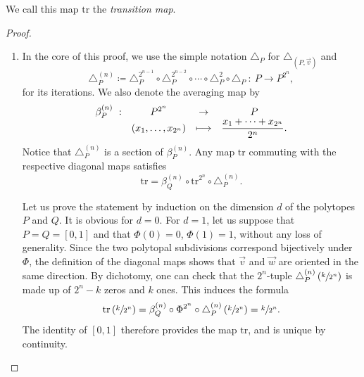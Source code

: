 \documentclass[JEP,XML,SOM,Unicode,NoFloatCountersInSection]{cedram}
\def\mto{\mathchoice{\longmapsto}{\mapsto}{\mapsto}{\mapsto}}
\let\dpl\displaystyle
\theoremstyle{plain}
\theoremstyle{definition}
\newcommand{\tr}{\mathrm{tr}}
\begin{document}
We call this map $\tr$ the \emph{transition map}.

\skpt
\begin{proof}
\begin{enumerate}
\item
In the core of this proof, we use the simple notation $\triangle_P$ for $\triangle_{(P, \vec v)}$ and
\[\triangle^{(n)}_P\coloneqq \triangle^{2^{n-1}}_P\circ \triangle^{2^{n-2}}_P\circ\cdots\circ\triangle^{2}_P\circ\triangle_P\ : \
P\to P^{2^{n}},\]
for its iterations.
We also denote the averaging map by
\begin{align*}
\begin{array}{rccc}
\beta^{(n)}_P\ : & P^{2^n}&\dpl\to &P\\
&(x_1, \ldots, x_{2^n}) & \dpl\mto&
\displaystyle \frac{x_1+\cdots+x_{2^n}}{2^n}.
\end{array}
\end{align*}
Notice that $\triangle^{(n)}_P$ is a section of $\beta^{(n)}_P$.
Any map $\tr$ commuting with the respective diagonal maps satisfies
\[\tr = \beta^{(n)}_Q\circ\tr^{2^n}\circ\triangle^{(n)}_P. \]

Let us prove the statement by induction on the dimension $d$ of the polytopes $P$ and $Q$. It is obvious for $d=0$. For $d=1$, let us suppose that $P=Q=[0,1]$ and that $\Phi(0)=0$, $\Phi(1)=1$, without any loss of generality.
Since the two polytopal subdivisions correspond bijectively under $\Phi$, the definition of the diagonal maps shows that $\vec v$ and $\vec w$ are oriented in the same direction. By dichotomy, one can check that the $2^n$-tuple $\triangle^{(n)}_P\left(\sfrac{k}{2^n}\right)$ is made up of $2^{n}-k$ zeros and $k$ ones. This induces the formula
\[\tr\left(\sfrac{k}{2^n}\right)
= \beta^{(n)}_Q\circ\Phi^{2^n}\circ\triangle^{(n)}_P\left(\sfrac{k}{2^n}\right)
= \sfrac{k}{2^n}. \]
The identity of $[0, 1]$ therefore provides the map $\tr$, and is unique by continuity.


\end{enumerate}
\end{proof}
\end{document}
